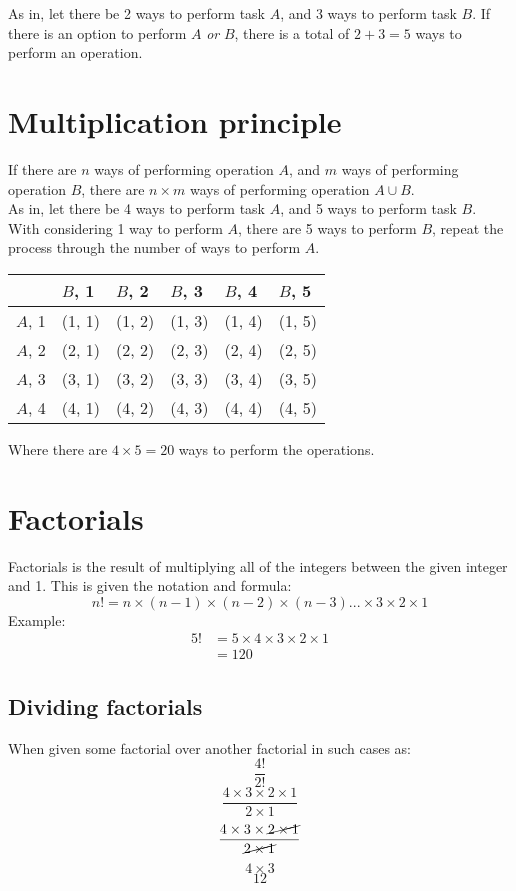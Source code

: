 \documentclass[a4paper,10pt]{report}
\begin{document}
		As in, let there be 2 ways to perform task $A$, and 3 ways to perform task $B$.  If there is an option to perform $A$ \emph{or} $B$, there is a total of $2 + 3 = 5$ ways to perform an operation.


	\section{Multiplication principle}
		If there are $n$ ways of performing operation $A$, and $m$ ways of performing operation $B$, there are $n \times m$ ways of performing operation $A \cup B$.\\

		As in, let there be 4 ways to perform task $A$, and 5 ways to perform task $B$.  With considering 1 way to perform $A$, there are 5 ways to perform $B$, repeat the process through the number of ways to perform $A$.
		\begin{center}
			\begin{tabular}{l|lllll}
				   & $B$, 1 & $B$, 2 & $B$, 3 & $B$, 4 & $B$, 5\\ \hline
			$A$, 1 & (1, 1) & (1, 2) & (1, 3) & (1, 4) & (1, 5)\\
			$A$, 2 & (2, 1) & (2, 2) & (2, 3) & (2, 4) & (2, 5)\\
			$A$, 3 & (3, 1) & (3, 2) & (3, 3) & (3, 4) & (3, 5)\\
			$A$, 4 & (4, 1) & (4, 2) & (4, 3) & (4, 4) & (4, 5)\\
			\end{tabular}
		\end{center}
		Where there are $4 \times 5 = 20$ ways to perform the operations.


	\section{Factorials}
		Factorials is the result of multiplying all of the integers between the given integer and 1.  This is given the notation and formula:
		$$
			n! = n \times (n-1) \times (n-2) \times (n-3)... \times 3 \times 2 \times 1
		$$
		Example:\\
		\begin{align*}
			5! & = 5 \times 4 \times 3 \times 2 \times 1 \\
			   & = 120
		\end{align*}


		\subsection{Dividing factorials}
			When given some factorial over another factorial in such cases as:
			$$\frac{4!}{2!}$$
			$$\frac{4 \times 3 \times 2 \times 1}{2 \times 1}$$
			$$\frac{4 \times 3 \times \cancel{2 \times 1}}{\cancel{2 \times 1}}$$
			$$4 \times 3$$
			$$12$$
\end{document}
